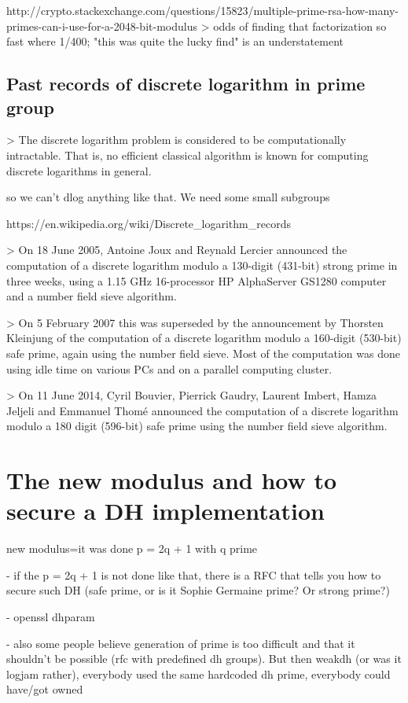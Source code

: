 \documentclass[a4paper,11pt]{article}
\begin{document}
http://crypto.stackexchange.com/questions/15823/multiple-prime-rsa-how-many-primes-can-i-use-for-a-2048-bit-modulus
> odds of finding that factorization so fast where 1/400; "this was quite the lucky find" is an understatement

\subsection{Past records of discrete logarithm in prime group}

> The discrete logarithm problem is considered to be computationally intractable. That is, no efficient classical algorithm is known for computing discrete logarithms in general.

so we can't dlog anything like that. We need some small subgroups

https://en.wikipedia.org/wiki/Discrete_logarithm_records

> On 18 June 2005, Antoine Joux and Reynald Lercier announced the computation of a discrete logarithm modulo a 130-digit (431-bit) strong prime in three weeks, using a 1.15 GHz 16-processor HP AlphaServer GS1280 computer and a number field sieve algorithm.

> On 5 February 2007 this was superseded by the announcement by Thorsten Kleinjung of the computation of a discrete logarithm modulo a 160-digit (530-bit) safe prime, again using the number field sieve. Most of the computation was done using idle time on various PCs and on a parallel computing cluster.

> On 11 June 2014, Cyril Bouvier, Pierrick Gaudry, Laurent Imbert, Hamza Jeljeli and Emmanuel Thomé announced the computation of a discrete logarithm modulo a 180 digit (596-bit) safe prime using the number field sieve algorithm.

\section{The new modulus and how to secure a DH implementation}

new modulus=it was done p = 2q + 1 with q prime


- if the p = 2q + 1 is not done like that, there is a RFC that tells you how to secure such DH (safe prime, or is it Sophie Germaine prime? Or strong prime?)

- openssl dhparam

- also some people believe generation of prime is too difficult and that it shouldn't be possible (rfc with predefined dh groups). But then weakdh (or was it logjam rather), everybody used the same hardcoded dh prime, everybody could have/got owned
\end{document}
